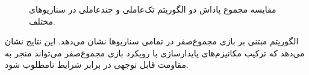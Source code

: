 \begin{figure}[H]
	
	\caption{مقایسه مجموع پاداش دو الگوریتم تک‌عاملی و چندعاملی  در سناریوهای مختلف. 
		}
	\label{fig:td3_robustness_violin}
\end{figure}

الگوریتم  مبتنی بر بازی مجموع‌صفر در تمامی سناریوها نشان می‌دهد. 
این نتایج نشان می‌دهد که ترکیب مکانیزم‌های پایدارسازی  با رویکرد بازی مجموع‌صفر می‌تواند منجر به مقاومت قابل توجهی در برابر شرایط نامطلوب شود.







